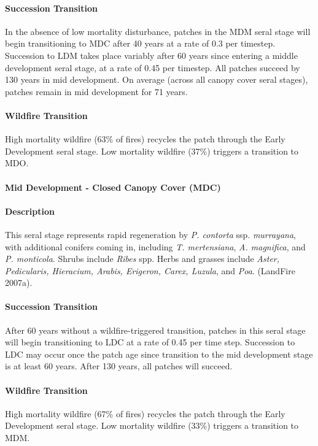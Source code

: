\paragraph{Succession Transition} In the absence of low mortality disturbance, patches in the MDM seral stage will begin transitioning to MDC after 40 years at a rate of 0.3 per timestep. Succession to LDM takes place variably after 60 years since entering a middle development seral stage, at a rate of 0.45 per timestep. All patches succeed by 130 years in mid development.  On average (across all canopy cover seral stages), patches remain in mid development for 71 years.
 
\paragraph{Wildfire Transition} High mortality wildfire (63\% of fires) recycles the patch through the Early Development seral stage. Low mortality wildfire (37\%) triggers a transition to MDO.

\noindent\hrulefill

\paragraph{Mid Development - Closed Canopy Cover (MDC)}

\paragraph{Description} This seral stage represents rapid regeneration by \emph{P. contorta} ssp. \emph{murrayana}, with additional conifers coming in, including \emph{T. mertensiana}, \emph{A. magnifica}, and \emph{P. monticola}. Shrubs include \emph{Ribes} spp. Herbs and grasses include \emph{Aster, Pedicularis, Hieracium, Arabis, Erigeron, Carex, Luzula}, and \emph{Poa}. (LandFire 2007a).

\paragraph{Succession Transition} After 60 years without a wildfire-triggered transition, patches in this seral stage will begin transitioning to LDC at a rate of 0.45 per time step. Succession to LDC may occur once the patch age since transition to the mid development stage is at least 60 years. After 130 years, all patches will succeed.

\paragraph{Wildfire Transition} High mortality wildfire (67\% of fires) recycles the patch through the Early Development seral stage. Low mortality wildfire (33\%) triggers a transition to MDM.

